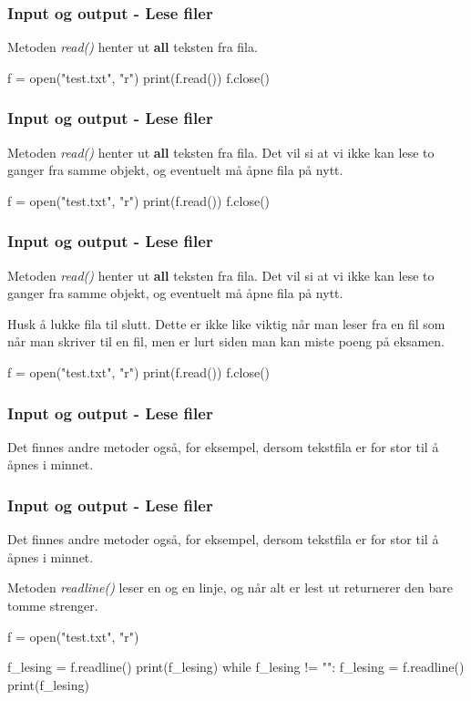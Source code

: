 \begin{frame}[fragile]
    \frametitle{Input og output - Lese filer}

    Metoden \textit{read()} henter ut \textbf{all} teksten fra fila. 

\begin{python}
f = open("test.txt", "r")
print(f.read())
f.close()
\end{python}

\end{frame}

\begin{frame}[fragile]
    \frametitle{Input og output - Lese filer}

    Metoden \textit{read()} henter ut \textbf{all} teksten fra fila. Det vil si at vi ikke kan lese to ganger fra samme objekt, og eventuelt må åpne fila på nytt. 

\begin{python}
f = open("test.txt", "r")
print(f.read())
f.close()
\end{python}

\end{frame}

\begin{frame}[fragile]
    \frametitle{Input og output - Lese filer}

    Metoden \textit{read()} henter ut \textbf{all} teksten fra fila. Det vil si at vi ikke kan lese to ganger fra samme objekt, og eventuelt må åpne fila på nytt. 

    Husk å lukke fila til slutt. Dette er ikke like viktig når man leser fra en fil som når man skriver til en fil, men er lurt siden man kan miste poeng på eksamen. 

\begin{python}
f = open("test.txt", "r")
print(f.read())
f.close()
\end{python}

\end{frame}

\begin{frame}[fragile]
    \frametitle{Input og output - Lese filer}

    Det finnes andre metoder også, for eksempel, dersom tekstfila er for stor til å åpnes i minnet. 

\end{frame}

\begin{frame}[fragile]
    \frametitle{Input og output - Lese filer}

    Det finnes andre metoder også, for eksempel, dersom tekstfila er for stor til å åpnes i minnet. 
    
    Metoden \textit{readline()} leser en og en linje, og når alt er lest ut returnerer den bare tomme strenger. 

\begin{python}
f = open("test.txt", "r")

f_lesing = f.readline()
print(f_lesing)
while f_lesing != "":
    f_lesing = f.readline()
    print(f_lesing)

\end{python}

\end{frame}

